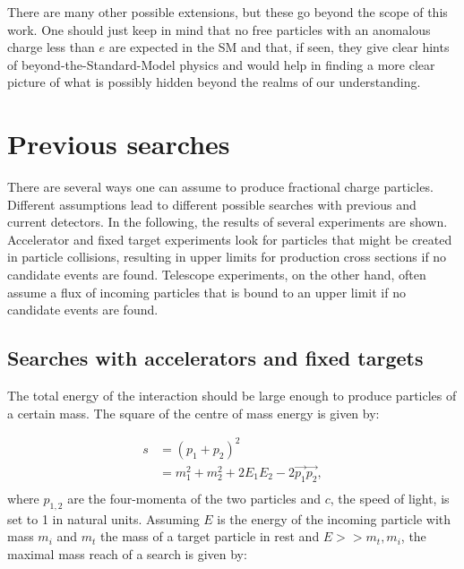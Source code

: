 \noindent There are many other possible extensions, but these go beyond the scope of this work. One should just keep in mind that no free particles with an anomalous charge less than $e$ are expected in the SM and that, if seen, they give clear hints of beyond-the-Standard-Model physics and would help in finding a more clear picture of what is possibly hidden beyond the realms of our understanding.





\section{Previous searches}
\label{sec:prevsearches}
There are several ways one can assume to produce fractional charge particles. Different assumptions lead to different possible searches with previous and current detectors. In the following, the results of several experiments are shown. Accelerator and fixed target experiments look for particles that might be created in particle collisions, resulting in upper limits for production cross sections if no candidate events are found. Telescope experiments, on the other hand, often assume a flux of incoming particles that is bound to an upper limit if no candidate events are found.

\subsection{Searches with accelerators and fixed targets}
The total energy of the interaction should be large enough to produce particles of a certain mass. The square of the centre of mass energy is given by:

\begin{equation}
\label{eq:totalenergy}
\begin{split}
s &= \left(p_1 + p_2\right)^2\\
&= m_1^2 + m_2^2 + 2E_1E_2 - 2\vec{p_1}\vec{p_2},\\
\end{split}
\end{equation}
where $p_{1,2}$ are the four-momenta of the two particles and $c$, the speed of light, is set to 1 in natural units.
Assuming $E$ is the energy of the incoming particle with mass $m_i$ and $m_t$ the mass of a target particle in rest and $E >> m_t, m_i$, the maximal mass reach of a search is given by:


